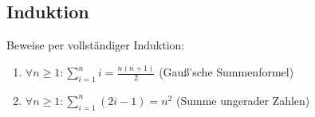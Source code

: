 \documentclass[11pt, a4paper]{article}
\newif\ifshowsolution
\begin{document}
\subsection{Induktion}
Beweise per vollständiger Induktion:
\begin{enumerate}
	\item $\forall n \geq 1 : \sum_{i=1}^n i = \frac{n(n+1)}{2}$ (Gauß'sche Summenformel)
	
	\ifshowsolution
		\begin{description}
			\item[Anfang] $n=1$
				\begin{align*}
					\sum_{i=1}^1 1 &= \frac{1(1+1)}{2} \\
					1 &= \frac{2}{2}
				\end{align*}
			\item[Annahme] $\sum_{i=1}^n i = \frac{n(n+1)}{2}$
			\item[Schritt] 
			\begin{align*}
				\sum_{i=1}^{n+1} i &= \frac{(n+1)(n+2)}{2} \\
				n+1 + \sum_{i=1}^n i &= \frac{(n+1)(n+2)}{2} \\
				n+1 + \frac{n(n+1)}{2} &= \frac{(n+1)(n+2)}{2} \\
				n+1 + \frac{n^2 + n}{2} &= \frac{n^2 + 3n + 2}{2} \\
				\frac{2n+2}{2} + \frac{n^2 + n}{2} &= \frac{n^2 + 3n + 2}{2} \\
				\frac{n^2 + 3n + 2}{2} &= \frac{n^2 + 3n + 2}{2}
			\end{align*}
		\end{description}
	\fi
	
	\item $\forall n \geq 1 : \sum_{i=1}^n (2i-1) = n^2$ (Summe ungerader Zahlen)
	
	\ifshowsolution
		\begin{description}
			\item[Anfang] $n=1$
				\begin{align*}
					\sum_{i=1}^1 (2i-1) &= 1^2 \\
					2 \cdot 1-1 &= 1 \\
					1 &= 1
				\end{align*}
			\item[Annahme] $\sum_{i=1}^n (2i-1) = n^2$
			\item[Schritt] 
				\begin{align*}
					\sum_{i=1}^{n+1} (2i-1) &= (n+1)^2 \\
					2(n+1) - 1 + \sum_{i=1}^n (2i-1) &= (n+1)^2 \\
					2(n+1) - 1 + n^2 &= (n+1)^2 \\
					n^2+2n+1 &= (n+1)^2 \\
					(n+1)^2 &= (n+1)^2
				\end{align*}
		\end{description}
	\fi
	

\end{enumerate}
\end{document}

